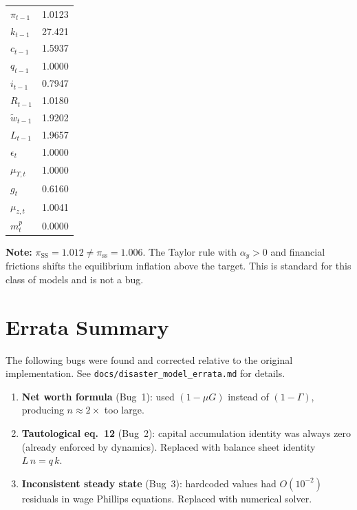 \documentclass[11pt]{article}
\begin{document}
\begin{table}[h!]
\begin{minipage}[t]{0.45\linewidth}
\begin{tabular}{lr}
\midrule
$\pi_{t-1}$        & 1.0123 \\
$k_{t-1}$          & 27.421 \\
$c_{t-1}$          & 1.5937 \\
$q_{t-1}$          & 1.0000 \\
$i_{t-1}$          & 0.7947 \\
$R_{t-1}$          & 1.0180 \\
$\tilde{w}_{t-1}$  & 1.9202 \\
$L_{t-1}$          & 1.9657 \\
\midrule
$\epsilon_t$       & 1.0000 \\
$\mu_{\Upsilon,t}$ & 1.0000 \\
$g_t$              & 0.6160 \\
$\mu_{z,t}$        & 1.0041 \\
$m_t^p$            & 0.0000 \\
\bottomrule
\end{tabular}
\bigskip

\textbf{Note:} $\pi_{\text{SS}} = 1.012 \neq \pi_{\text{ss}} = 1.006$.
The Taylor rule with $\alpha_y > 0$ and financial frictions shifts
the equilibrium inflation above the target. This is standard for
this class of models and is not a bug.
\end{minipage}
\end{table}


\section{Errata Summary}
\label{sec:errata}

The following bugs were found and corrected relative to the original
implementation. See \texttt{docs/disaster\_model\_errata.md} for details.

\begin{enumerate}
\item \textbf{Net worth formula} (Bug~1): used $(1-\mu G)$ instead of
  $(1-\Gamma)$, producing $n \approx 2\times$ too large.

\item \textbf{Tautological eq.~12} (Bug~2): capital accumulation identity
  was always zero (already enforced by dynamics). Replaced with balance
  sheet identity $L\,n = q\,k$.

\item \textbf{Inconsistent steady state} (Bug~3): hardcoded values had
  $O(10^{-2})$ residuals in wage Phillips equations. Replaced with
  numerical solver.
\end{enumerate}
\end{document}
